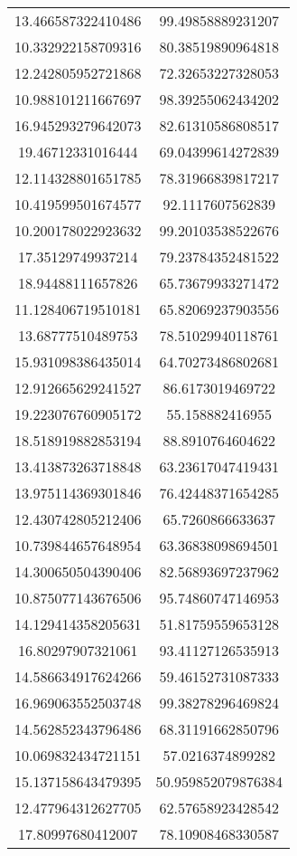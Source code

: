 \begin{table}
\begin{tabular}{cc}
13.466587322410486 & 99.49858889231207 \\
10.332922158709316 & 80.38519890964818 \\
12.242805952721868 & 72.32653227328053 \\
10.988101211667697 & 98.39255062434202 \\
16.945293279642073 & 82.61310586808517 \\
19.46712331016444 & 69.04399614272839 \\
12.114328801651785 & 78.31966839817217 \\
10.419599501674577 & 92.1117607562839 \\
10.200178022923632 & 99.20103538522676 \\
17.35129749937214 & 79.23784352481522 \\
18.94488111657826 & 65.73679933271472 \\
11.128406719510181 & 65.82069237903556 \\
13.68777510489753 & 78.51029940118761 \\
15.931098386435014 & 64.70273486802681 \\
12.912665629241527 & 86.6173019469722 \\
19.223076760905172 & 55.158882416955 \\
18.518919882853194 & 88.8910764604622 \\
13.413873263718848 & 63.23617047419431 \\
13.975114369301846 & 76.42448371654285 \\
12.430742805212406 & 65.7260866633637 \\
10.739844657648954 & 63.36838098694501 \\
14.300650504390406 & 82.56893697237962 \\
10.875077143676506 & 95.74860747146953 \\
14.129414358205631 & 51.81759559653128 \\
16.80297907321061 & 93.41127126535913 \\
14.586634917624266 & 59.46152731087333 \\
16.969063552503748 & 99.38278296469824 \\
14.562852343796486 & 68.31191662850796 \\
10.069832434721151 & 57.0216374899282 \\
15.137158643479395 & 50.959852079876384 \\
12.477964312627705 & 62.57658923428542 \\
17.80997680412007 & 78.10908468330587 \\

\end{tabular}
\end{table}
